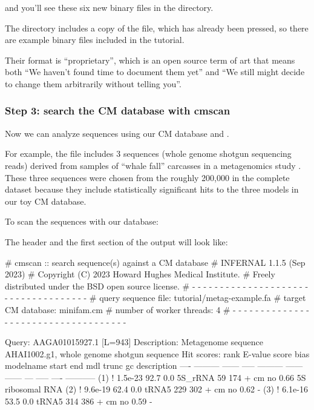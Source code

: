 and you'll see these six new binary files in the directory. 

The  directory includes a copy of the
 file, which has already been pressed, so there
are example binary files 
included in the tutorial.

Their format is ``proprietary'', which is an open source term of art
that means both ``We haven't found time to document them yet'' and ``We
still might decide to change them arbitrarily without telling you''.

\subsubsection{Step 3: search the CM database with cmscan}

Now we can analyze sequences using our CM database and
. 

For example, the file  includes 3
sequences (whole genome shotgun sequencing reads) derived from samples
of ``whale fall'' carcasses in a metagenomics study
\citep{Tringe05}. These three sequences were chosen from the roughly
200,000 in the complete dataset because they include statistically
significant hits to the three models in our toy CM database.

To scan the sequences with our database: 


The header and the first section of the output will look like:

\begin{sreoutput}
# cmscan :: search sequence(s) against a CM database
# INFERNAL 1.1.5 (Sep 2023)
# Copyright (C) 2023 Howard Hughes Medical Institute.
# Freely distributed under the BSD open source license.
# - - - - - - - - - - - - - - - - - - - - - - - - - - - - - - - - - - - -
# query sequence file:                   tutorial/metag-example.fa
# target CM database:                    minifam.cm
# number of worker threads:              4
# - - - - - - - - - - - - - - - - - - - - - - - - - - - - - - - - - - - -

Query:       AAGA01015927.1  [L=943]
Description: Metagenome sequence AHAI1002.g1, whole genome shotgun sequence
Hit scores:
 rank     E-value  score  bias  modelname  start    end   mdl trunc   gc  description
 ----   --------- ------ -----  --------- ------ ------   --- ----- ----  -----------
  (1) !   1.5e-23   92.7   0.0  5S_rRNA       59    174 +  cm    no 0.66  5S ribosomal RNA
  (2) !   9.6e-19   62.4   0.0  tRNA5        229    302 +  cm    no 0.62  -
  (3) !   6.1e-16   53.5   0.0  tRNA5        314    386 +  cm    no 0.59  -
\end{sreoutput}

